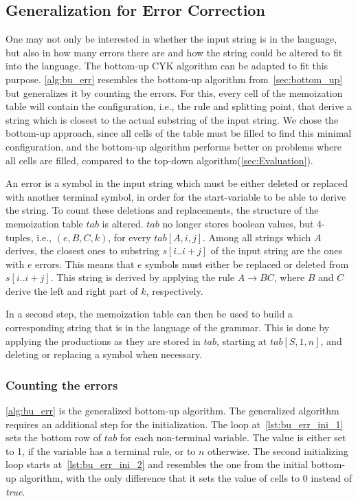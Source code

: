 \pagebreak
\subsection{Generalization for Error Correction}
One may not only be interested in whether the input string is in the language, but also in how many errors there are and how the string could be altered to fit into the language.
The bottom-up CYK algorithm can be adapted to fit this purpose.
\cref{alg:bu_err} resembles the bottom-up algorithm from~\cref{sec:bottom_up} but generalizes it by counting the errors.
For this, every cell of the memoization table will contain the configuration, i.e., the rule and splitting point, that derive a string which is closest to the actual substring of the input string.
We chose the bottom-up approach, since all cells of the table must be filled to find this minimal configuration, and the bottom-up algorithm performs better on problems where all cells are filled, compared to the top-down algorithm(\cref{sec:Evaluation}).

An error is a symbol in the input string which must be either deleted or replaced with another terminal symbol, in order for the start-variable to be able to derive the string.
To count these deletions and replacements, the structure of the memoization table $tab$ is altered.
$tab$ no longer stores boolean values, but 4-tuples, i.e., $(e, B, C, k)$, for every $tab[A,i,j]$.
Among all strings which $A$ derives, the closest ones to substring $s[i..i+j]$ of the input string are the ones with $e$ errors.
This means that $e$ symbols must either be replaced or deleted from $s[i..i+j]$.
This string is derived by applying the rule $A\rightarrow BC$, where $B$ and $C$ derive the left and right part of $k$, respectively.

In a second step, the memoization table can then be used to build a corresponding string that is in the language of the grammar.
This is done by applying the productions as they are stored in $tab$, starting at $tab[S,1,n]$, and deleting or replacing a symbol when necessary.

\subsubsection{Counting the errors}
\cref{alg:bu_err} is the generalized bottom-up algorithm.
The generalized algorithm requires an additional step for the initialization.
The loop at~\cref{lst:bu_err_ini_1} sets the bottom row of $tab$ for each non-terminal variable.
The value is either set to 1, if the variable has a terminal rule, or to $n$ otherwise.
The second initializing loop starts at~\cref{lst:bu_err_ini_2} and resembles the one from the initial bottom-up algorithm, with the only difference that it sets the value of cells to $0$ instead of \textit{true}.

